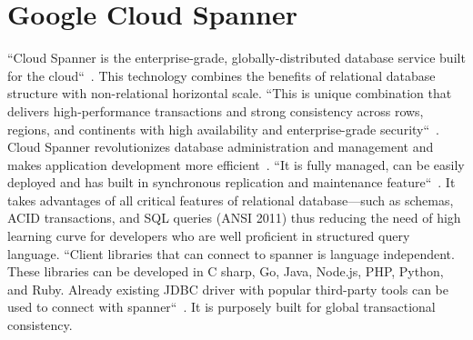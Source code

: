 \section{Google Cloud Spanner}

``Cloud Spanner is the enterprise-grade, globally-distributed database 
service built for the cloud``~\cite{hid-sp18-523-www-google-spanner}. 
This technology combines the benefits of relational database structure 
with non-relational horizontal scale. ``This is unique combination that 
delivers high-performance transactions and strong consistency across rows, 
regions, and continents with high availability and enterprise-grade 
security``~\cite{hid-sp18-523-www-google-spanner}. Cloud Spanner 
revolutionizes database administration and management and makes 
application development more efficient~\cite{hid-sp18-523-www-google-spanner}.
``It is fully managed, can be easily deployed and has built in synchronous 
replication and maintenance feature``~\cite{hid-sp18-523-www-google-spanner}. 
It takes advantages of all critical features of relational database—such 
as schemas, ACID transactions, and SQL queries (ANSI 2011) thus reducing 
the need of high learning curve for developers who are well proficient in 
structured query language. 
``Client libraries that can connect to spanner is language independent. 
These libraries can be developed in C sharp, Go, Java, Node.js, PHP, Python, 
and Ruby. Already existing JDBC driver with popular third-party tools can be 
used to connect with spanner``~\cite{hid-sp18-523-www-google-spanner}. It is 
purposely built for global transactional consistency.

